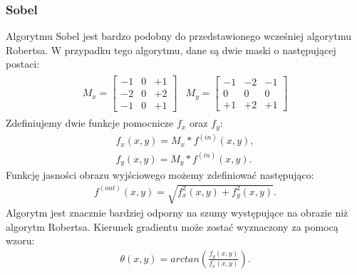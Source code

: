 \subsubsection{Sobel} \label{sssec:sobel}
Algorytmu Sobel jest bardzo podobny do przedstawionego wcześniej algorytmu Robertsa. W przypadku tego algorytmu, dane są dwie maski o następującej postaci:
\begin{gather*}
\begin{matrix}
  M_x = \begin{bmatrix}
    -1 & 0 & +1 \\
    -2 & 0 & +2 \\
    -1 & 0 & +1
  \end{bmatrix}
&
  M_y = \begin{bmatrix}
    -1 & -2 & -1 \\
    0 & 0 & 0 \\
    +1 & +2 & +1
  \end{bmatrix}
\end{matrix}
\end{gather*}
Zdefiniujemy dwie funkcje pomocnicze $f_x$ oraz $f_y$:
\begin{gather*}
  f_x(x, y)  = M_x * f^{(in)}(x, y), \\
  f_y(x, y)  = M_y * f^{(in)}(x, y).
\end{gather*}
Funkcję jasności obrazu wyjściowego możemy zdefiniować następująco:
\begin{gather*}
  f^{(out)}(x, y) = \sqrt{f_x^2(x, y)+f_{y}^2(x, y)}.
\end{gather*}
Algorytm jest znacznie bardziej odporny na szumy występujące na obrazie niż algorytm Robertsa. Kierunek gradientu może zostać wyznaczony za pomocą wzoru:
\begin{gather*}
  \theta(x, y) = arctan(\frac{f_y(x, y)}{f_x(x, y)}).
\end{gather*}
